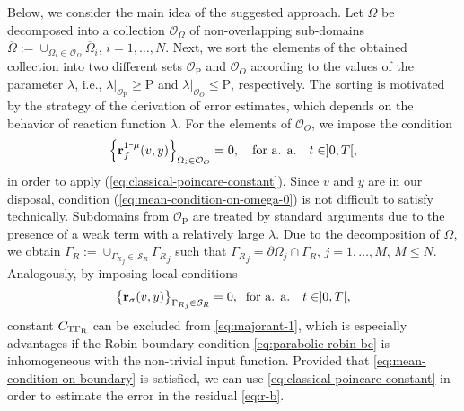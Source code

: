 Below, we consider the main idea of the suggested approach. Let $\Omega$ be decomposed 
into a collection $\mathcal{O}_\Omega$ of non-overlapping sub-domains
%
$\overline{\Omega} := \cup_{\Omega_i \in \, \mathcal{O}_\Omega} \overline{\Omega}_i$, 
$i = 1, \ldots, N$. Next, we sort the elements of the obtained collection into two different 
sets $\mathcal{O}_{\mathrm{P}}$ and $\mathcal{O}_{O}$ according to the values of the 
parameter $\lambda$, i.e., $\lambda|_{\mathcal{O}_{\mathrm{P}}} \geq \mathrm{P}$ and 
$\lambda|_{\mathcal{O}_{O}} \leq \mathrm{P}$, respectively. The sorting is motivated by 
the strategy of the derivation of error estimates, which depends on the behavior of
reaction function $\lambda$.
%
For the elements of $\mathcal{O}_{O}$, we impose the condition
%
\begin{equation}
	\Mean{ \R^{ 1 \minus \mu}_{f} (v, y) }{\Omega_i \in \mathcal{O}_{O}} = 0, \quad
	\mbox{for a. a.} \quad t \in ]0, T[,
	\label{eq:mean-condition-on-omega-0}
\end{equation}
%
in order to apply (\ref{eq:classical-poincare-constant}). 
Since $v$ and $y$ are in our disposal, condition (\ref{eq:mean-condition-on-omega-0})
is not difficult to satisfy technically. Subdomains from $\mathcal{O}_{\mathrm{P}}$ are 
treated by standard arguments due to the presence of a weak term with a relatively large 
$\lambda$.
%
Due to the decomposition of $\Omega$, we obtain
$\Gamma_R := 
\cup_{ {\Gamma_R}_j \in \, \mathcal{S}_{R}} {\Gamma_R}_j $ such that
${\Gamma_R}_j = \partial \Omega_j \cap \Gamma_R$, $j = 1, \ldots, M$, $M \leq N$.
%
Analogously, by imposing local conditions
%
\begin{equation}
	\smallMean{ \R_\sigma (v, y) }{{\Gamma_R}_{j} \in \mathcal{S}_{R}} = 0, \; \;
	\mbox{for a. a.} \quad t \in ]0, T[,
	\label{eq:mean-condition-on-boundary}
\end{equation}
%
constant $C_{{\rm T} \Gamma_{\rm R}}$ can be excluded from \eqref{eq:majorant-1}, which
is especially advantages if the Robin boundary condition \eqref{eq:parabolic-robin-bc} 
is inhomogeneous with the non-trivial input function. Provided that 
\eqref{eq:mean-condition-on-boundary} is satisfied, we can use 
\eqref{eq:classical-poincare-constant} in order to estimate the error in the residual 
\eqref{eq:r-b}. 

